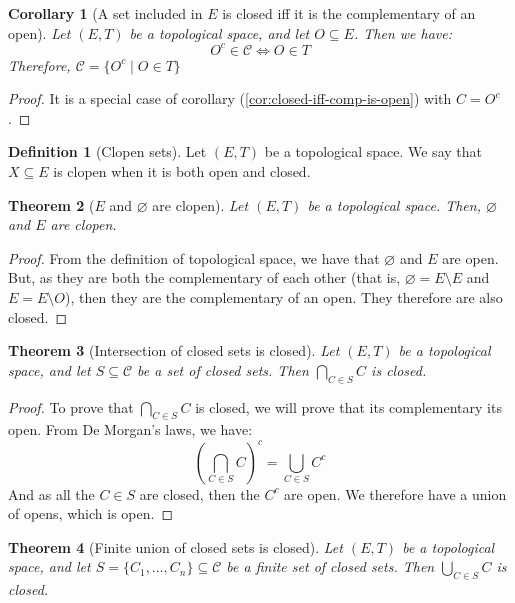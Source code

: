 \documentclass{article}
\newtheorem{theorem}{Theorem}[section]
\newtheorem{corollary}[theorem]{Corollary}
\theoremstyle{definition}
\newtheorem{definition}{Definition}[section]
\theoremstyle{remark}
\theoremstyle{example}
\theoremstyle{notation}
\newcommand{\closed}{\mathcal{C}}
\begin{document}
\begin{corollary}[A set included in $E$ is closed iff it is the complementary of an open]
		Let $(E, T)$ be a topological space, and let $O \subseteq E$. Then we have:
				$$O^c \in \closed \iff O \in T$$
		Therefore, $\closed = \{O^c \mid O \in T\}$
\end{corollary}

\begin{proof}
		It is a special case of corollary (\ref{cor:closed-iff-comp-is-open}) with $C = O^c$.
\end{proof}

\begin{definition}[Clopen sets]
		Let $(E, T)$ be a topological space. We say that $X \subseteq E$ is clopen when it is both open and closed.
\end{definition}

\begin{theorem}[$E$ and $\varnothing$ are clopen]
		Let $(E, T)$ be a topological space. Then, $\varnothing$ and $E$ are clopen.
\end{theorem}

\begin{proof}
		From the definition of topological space, we have that $\varnothing$ and $E$ are open. But, as they are both the complementary of each other (that is, $\varnothing = E \setminus E$ and $E = E \setminus O$), then they are the complementary of an open. They therefore are also closed.
\end{proof}

\begin{theorem}[Intersection of closed sets is closed]
		Let $(E, T)$ be a topological space, and let $S \subseteq \closed$ be a set of closed sets. Then $\bigcap_{C \in S} C$ is closed.
\end{theorem}

\begin{proof}
		To prove that $\bigcap_{C \in S} C$ is closed, we will prove that its complementary its open. From De Morgan's laws, we have:
				$$(\bigcap_{C \in S} C)^c = \bigcup_{C \in S} C^c$$
		And as all the $C \in S$ are closed, then the $C^c$ are open. We therefore have a union of opens, which is open.
\end{proof}

\begin{theorem}[Finite union of closed sets is closed]
		Let $(E, T)$ be a topological space, and let $S = \{C_1, \dots, C_n\} \subseteq \closed$ be a finite set of closed sets. Then $\bigcup_{C \in S} C$ is closed.
\end{theorem}
\end{document}
